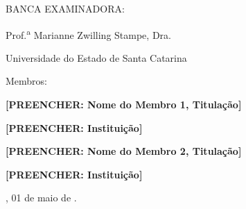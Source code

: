 

%
% 
%
\begin{folhadeaprovacao}



	\begin{center}
		{\selectfont\MakeTextUppercase{\normalsize\imprimirautor}}
	\end{center}
    \vfill
    
	\vfill
	\begin{center}
		{\selectfont\MakeTextUppercase{\imprimirtitulo}}
	\end{center}
	\vfill

    
%


\vfill
        
	 \begin{center}
	 	
    	{\selectfont BANCA EXAMINADORA: }
    	\vspace*{1.75cm}
    
		Prof.\textsuperscript{a} Marianne Zwilling Stampe, Dra. \par
		Universidade do Estado de Santa Catarina
	 \end{center}
	
    {Membros:}

	\begin{center}
		\vspace*{1.25cm}
		\textbf{[PREENCHER: Nome do Membro 1, Titulação]} \par
		\textbf{[PREENCHER: Instituição]}

		\vspace*{1.25cm}
		\textbf{[PREENCHER: Nome do Membro 2, Titulação]} \par
		\textbf{[PREENCHER: Instituição]}

	\end{center}
    
    \vspace*{\fill}  
    \begin{center}
    {\imprimirlocal, 01 de maio de \imprimirdata.}
	\end{center}
    \vspace*{0.25cm}  
\end{folhadeaprovacao}




